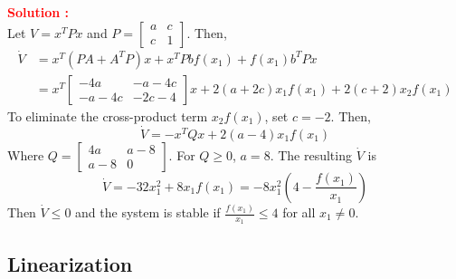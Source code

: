 \documentclass[12pt]{article}
\begin{document}
\textbf{\textcolor{red}{Solution :}} \\
Let \(V = x^T P x\) and \(P = \begin{bmatrix} a & c \\ c & 1 \end{bmatrix}\). Then,
\begin{align}
    \dot{V} &= x^T(PA + A^T P)x + x^T P b f(x_1) + f(x_1) b^T P x \\
    & = x^T \begin{bmatrix}
        -4a & -a-4c \\ -a-4c & -2c-4
    \end{bmatrix}x + 2(a+2c)x_1f(x_1) + 2(c+2)x_2f(x_1)
\end{align}  
To eliminate the cross-product term \(x_2 f(x_1)\), set \(c = -2\). Then,
\[ \dot{V} = -x^T Q x + 2(a-4)x_1 f(x_1) \]
Where \(Q = \begin{bmatrix}
    4a & a-8 \\ a-8 & 0
\end{bmatrix}\). For \(Q \geq 0\), \(a = 8\). The resulting \(\dot{V}\) is
\begin{equation}
    \dot{V} = -32 x_1^2 + 8x_1f(x_1) = -8x_1^2\left(4 - \frac{f(x_1)}{x_1}\right)
\end{equation}
Then \(\dot{V} \leq 0\) and the system is stable if \(\frac{f(x_1)}{x_1} \leq 4\) for all \(x_1 \neq 0\).
\clearpage

\subsection{Linearization}
\end{document}
